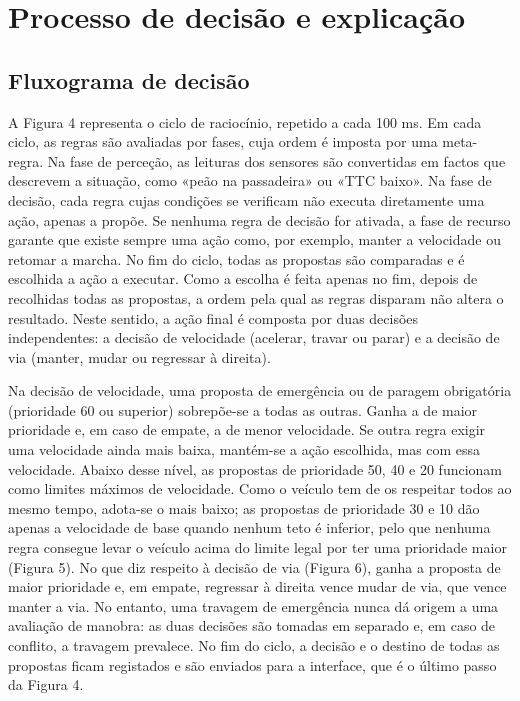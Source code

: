 \chapter{Processo de decisão e explicação}\label{cap:decisao}

\section{Fluxograma de decisão}\label{sec:fluxograma}

A Figura 4 representa o ciclo de raciocínio, repetido a cada 100 ms. Em cada ciclo, as regras são avaliadas por fases, cuja ordem é imposta por uma meta-regra. Na fase de perceção, as leituras dos sensores são convertidas em factos que descrevem a situação, como «peão na passadeira» ou «TTC baixo». Na fase de decisão, cada regra cujas condições se verificam não executa diretamente uma ação, apenas a propõe. Se nenhuma regra de decisão for ativada, a fase de recurso garante que existe sempre uma ação como, por exemplo, manter a velocidade ou retomar a marcha. No fim do ciclo, todas as propostas são comparadas e é escolhida a ação a executar. Como a escolha é feita apenas no fim, depois de recolhidas todas as propostas, a ordem pela qual as regras disparam não altera o resultado. Neste sentido, a ação final é composta por duas decisões independentes: a decisão de velocidade (acelerar, travar ou parar) e a decisão de via (manter, mudar ou regressar à direita).

Na decisão de velocidade, uma proposta de emergência ou de paragem obrigatória (prioridade 60 ou superior) sobrepõe-se a todas as outras. Ganha a de maior prioridade e, em caso de empate, a de menor velocidade. Se outra regra exigir uma velocidade ainda mais baixa, mantém-se a ação escolhida, mas com essa velocidade. Abaixo desse nível, as propostas de prioridade 50, 40 e 20 funcionam como limites máximos de velocidade. Como o veículo tem de os respeitar todos ao mesmo tempo, adota-se o mais baixo; as propostas de prioridade 30 e 10 dão apenas a velocidade de base quando nenhum teto é inferior, pelo que nenhuma regra consegue levar o veículo acima do limite legal por ter uma prioridade maior (Figura 5). No que diz respeito à decisão de via (Figura 6), ganha a proposta de maior prioridade e, em empate, regressar à direita vence mudar de via, que vence manter a via. No entanto, uma travagem de emergência nunca dá origem a uma avaliação de manobra: as duas decisões são tomadas em separado e, em caso de conflito, a travagem prevalece. No fim do ciclo, a decisão e o destino de todas as propostas ficam registados e são enviados para a interface, que é o último passo da Figura 4.


